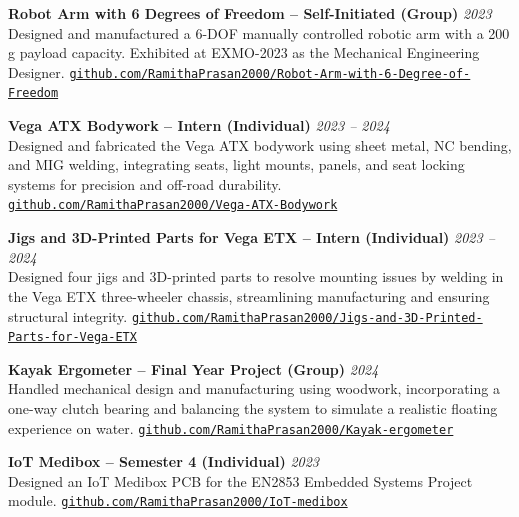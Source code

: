 \documentclass[10pt,a4paper]{article}
\newcommand{\entry}[2]{%
    \textbf{#1} \hfill {\itshape\color{dategray}#2}\\[2pt]
}
\begin{document}
\entry{Robot Arm with 6 Degrees of Freedom -- Self-Initiated (Group)}{2023}
\hspace*{1.5em}Designed and manufactured a 6-DOF manually controlled robotic arm with a 200 g payload capacity. Exhibited at EXMO-2023 as the Mechanical Engineering Designer. \newline
\hspace*{1.5em}\href{https://github.com/RamithaPrasan2000/Robot-Arm-with-6-Degree-of-Freedom-.git}{\nolinkurl{github.com/RamithaPrasan2000/Robot-Arm-with-6-Degree-of-Freedom}}

\entry{Vega ATX Bodywork -- Intern (Individual)}{2023 -- 2024}
\hspace*{1.5em}Designed and fabricated the Vega ATX bodywork using sheet metal, NC bending, and MIG welding, integrating seats, light mounts, panels, and seat locking systems for precision and off-road durability. \newline
\hspace*{1.5em}\href{https://github.com/RamithaPrasan2000/Vega-ATX-Bodywork.git}{\nolinkurl{github.com/RamithaPrasan2000/Vega-ATX-Bodywork}}

\entry{Jigs and 3D-Printed Parts for Vega ETX -- Intern (Individual)}{2023 -- 2024}
\hspace*{1.5em}Designed four jigs and 3D-printed parts to resolve mounting issues by welding in the Vega ETX three-wheeler chassis, streamlining manufacturing and ensuring structural integrity. \newline
\hspace*{1.5em}\href{https://github.com/RamithaPrasan2000/Jigs-and-3D-Printed-Parts-for-Vega-ETX.git}{\nolinkurl{github.com/RamithaPrasan2000/Jigs-and-3D-Printed-Parts-for-Vega-ETX}}

\entry{Kayak Ergometer -- Final Year Project (Group)}{2024}
\hspace*{1.5em}Handled mechanical design and manufacturing using woodwork, incorporating a one-way clutch bearing and balancing the system to simulate a realistic floating experience on water. \newline
\hspace*{1.5em}\href{https://github.com/RamithaPrasan2000/Kayak-ergometer.git}{\nolinkurl{github.com/RamithaPrasan2000/Kayak-ergometer}}

\entry{IoT Medibox -- Semester 4 (Individual)}{2023}
\hspace*{1.5em}Designed an IoT Medibox PCB for the EN2853 Embedded Systems Project module. \newline
\hspace*{1.5em}\href{https://github.com/RamithaPrasan2000/IoT-medibox.git}{\nolinkurl{github.com/RamithaPrasan2000/IoT-medibox}}
\end{document}
